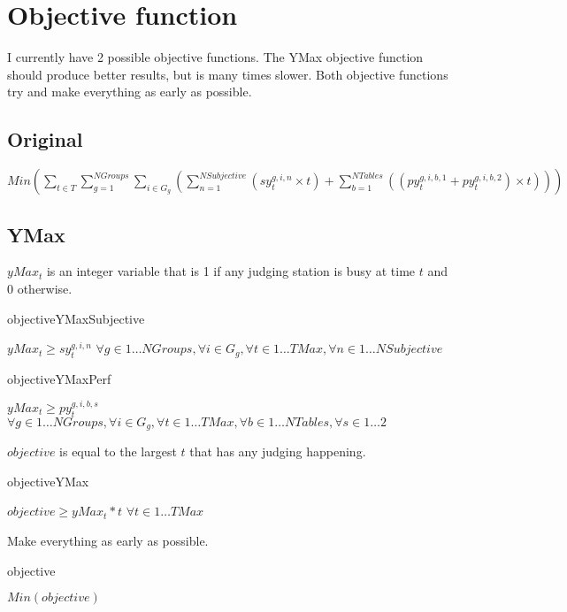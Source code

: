 \documentclass[letterpaper,11pt]{report}
\begin{document}
\FloatBarrier
\section{Objective function}
I currently have 2 possible objective functions. The YMax objective
function should produce better results, but is many times slower.
Both objective functions try and make everything as early as possible.

\FloatBarrier
\subsection{Original}
$Min ( 
\sum\limits_{t \in T}
 \sum\limits_{g=1}^{NGroups}
  \sum\limits_{i \in G_{g}} (
    \sum\limits_{n=1}^{NSubjective}
      ( sy_{t}^{g,i,n} \times t )
  + \sum\limits_{b=1}^{NTables} ( ( py_{t}^{g,i,b,1} + py_{t}^{g,i,b,2} )
  \times t)
  )
) $

\FloatBarrier
\subsection{YMax}
$yMax_{t}$ is an integer variable that is 1 if any judging station is busy at
time $t$ and 0 otherwise.

\begin{algorithm}
\caption{objectiveYMaxSubjective}
$yMax_{t} \ge sy_{t}^{g,i,n}$
\hfill$
\forall g \in 1 \dots NGroups,
\forall i \in G_{g}, 
\forall t \in 1 \dots TMax,
\forall n \in 1 \dots NSubjective
$
\end{algorithm}

\begin{algorithm}
\caption{objectiveYMaxPerf}
$yMax_{t} \ge py_{t}^{g,i,b,s}$
\hfill$
\forall g \in 1 \dots NGroups,
\forall i \in G_{g}, 
\forall t \in 1 \dots TMax,
\forall b \in 1 \dots NTables,
\forall s \in 1 \dots 2
$
\end{algorithm}

\FloatBarrier
$objective$ is equal to the largest $t$ that has any judging happening.
\begin{algorithm}
\caption{objectiveYMax}
$objective \ge yMax_{t} * t$
\hfill
$\forall t \in 1 \dots TMax$
\end{algorithm}

\FloatBarrier
Make everything as early as possible.
\begin{algorithm}
\caption{objective}
$Min(objective)$
\end{algorithm}
\end{document}
